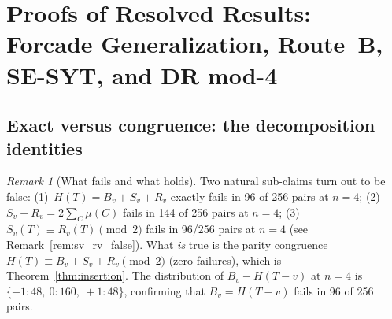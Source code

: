 \documentclass[12pt,reqno]{amsart}
\theoremstyle{plain}
\theoremstyle{definition}
\theoremstyle{remark}
\newtheorem{remark}[theorem]{Remark}
\begin{document}
\section{Proofs of Resolved Results: Forcade Generalization, Route~B, SE-SYT, and DR mod-4}
\label{sec:resolved}

\subsection{Exact versus congruence: the decomposition identities}

\begin{remark}[What fails and what holds]\label{rem:decomp_summary}
Two natural sub-claims turn out to be false:
(1)~$H(T) = B_v + S_v + R_v$ exactly fails in 96 of 256 pairs at $n=4$;
(2)~$S_v + R_v = 2\sum_C \mu(C)$ fails in 144 of 256 pairs at $n=4$;
(3)~$S_v(T) \equiv R_v(T) \pmod{2}$ fails in 96/256 pairs at $n=4$
(see Remark~\ref{rem:sv_rv_false}).
What \emph{is} true is the parity congruence $H(T) \equiv B_v + S_v + R_v \pmod{2}$
(zero failures), which is Theorem~\ref{thm:insertion}.
The distribution of $B_v - H(T{-}v)$ at $n=4$ is $\{-1: 48,\ 0: 160,\ +1: 48\}$,
confirming that $B_v = H(T{-}v)$ fails in 96 of 256 pairs.
\end{remark}
\end{document}
